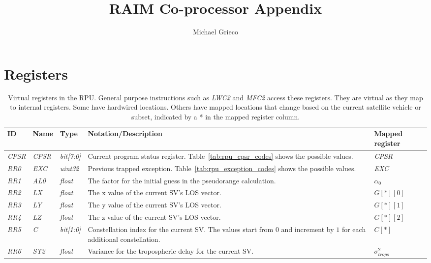 \documentclass[11pt]{article}
\title{RAIM Co-processor Appendix}
\author{Michael Grieco}
\date{}
\begin{document}
\section{Registers}

\begin{table}[htbp] \begin{center}
  \caption{Virtual registers in the RPU. General purpose instructions such as \emph{LWC2} and \emph{MFC2} access these registers. They are virtual as they map to internal registers. Some have hardwired locations. Others have mapped locations that change based on the current satellite vehicle or subset, indicated by a * in the mapped register column.}
  \label{tab:rpu_virtual_registers}
  \begin{tabular}{|m{1.25cm}|m{1.5cm}|m{1.75cm}|m{5.25cm}|m{1.5cm}|}
    \hline
    \textbf{ID} & \textbf{Name} & \textbf{Type} & \textbf{Notation/Description} & \textbf{Mapped register}\\ \hline

    \emph{CPSR} & \emph{CPSR} & \emph{bit[7:0]} & Current program status register. Table~\ref{tab:rpu_cpsr_codes} shows the possible values. & \emph{CPSR}\\ \hline

    \emph{RR0} & \emph{EXC} & \emph{uint32} & Previous trapped exception. Table~\ref{tab:rpu_exception_codes} shows the possible values. & \emph{EXC}\\ \hline

    \emph{RR1} & \emph{AL0} & \emph{float} & The factor for the initial guess in the pseudorange calculation. & $\alpha_0$\\ \hline

    \emph{RR2} & \emph{LX} & \emph{float} & The x value of the current SV's LOS vector. & $G[*][0]$\\ \hline
    \emph{RR3} & \emph{LY} & \emph{float} & The y value of the current SV's LOS vector. & $G[*][1]$\\ \hline
    \emph{RR4} & \emph{LZ} & \emph{float} & The z value of the current SV's LOS vector. & $G[*][2]$\\ \hline

    \emph{RR5} & \emph{C} & \emph{bit[1:0]} & Constellation index for the current SV. The values start from $0$ and increment by $1$ for each additional constellation. & $C[*]$\\ \hline

    \emph{RR6} & \emph{ST2} & \emph{float} & Variance for the tropospheric delay for the current SV. & $\sigma_{tropo}^2$\\ \hline


\end{tabular}
\end{center}
\end{table}
\end{document}
